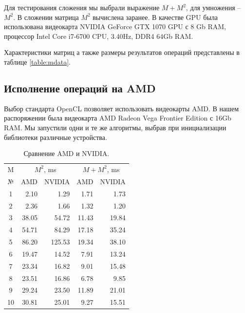 \documentclass[14pt]{extarticle}
\begin{document}
		Для тестирования сложения мы выбрали выражение $M + M^{2}$, для умножения -- $M^{2}$. В сложении матрица $M^2$ вычислена заранее. В качестве GPU была использована видеокарта NVIDIA GeForce GTX 1070 GPU с 8 Gb RAM, процессор Intel Core i7-6700 CPU, 3.40Hz, DDR4 64Gb RAM.  
		
		Характеристики матриц а также размеры результатов операций представлены в таблице \ref{table:mdata}. 
		

	
	\subsection{Исполнение операций на AMD}
	
	Выбор стандарта OpenCL позволяет использовать видеокарты AMD. В нашем распоряжении была видеокарта AMD Radeon Vega Frontier Edition с 16Gb RAM. Мы запустили одни и те же алгоритмы, выбрав при инициализации библиотеки различные устройства. 
	
		\begin{table}
		\centering
		\small
		\begin{tabular}{ |c|r r|r r|} 
			\hline
			M & \multicolumn{2}{c|}{$M^2$, ms} & \multicolumn{2}{c|}{$M+M^2$, ms} \\
			№ & AMD  & NVIDIA &  AMD  & NVIDIA  \\
			\hline
			1 & 2.10  & 1.29  & 1.71   & 1.73 \\ %
			2 & 2.36  & 1.66  & 1.32   & 1.20 \\ %
			3 & 38.05 & 54.72 & 11.43  & 19.84 \\ %
			4 & 54.71 & 84.29 & 17.18  & 35.24 \\ %
			5 & 86.20 & 125.53 & 19.34  & 38.10 \\ %
			6 & 19.47 & 14.52 & 7.91  & 13.24 \\ %
			7 & 23.34 & 16.82 & 9.01  & 15.48 \\ %
			8 & 23.51 & 16.86 & 6.78  & 9.85 \\ %
			9 & 29.24 & 23.50 & 11.89  & 21.01 \\ %
			10 & 30.81 & 25.01 & 9.27  & 15.51 \\ %
			\hline
			
			
		\end{tabular}
		\caption{Сравнение AMD и NVIDIA.}
		\label{table:AMD}
	\end{table}
	
\end{document}
